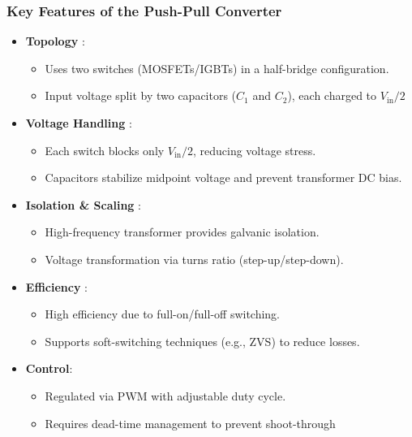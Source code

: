 \subsubsection*{Key Features of the Push-Pull Converter}
\begin{itemize}
    \item \textbf{Topology }: 
    \begin{itemize}
        \item Uses two switches (MOSFETs/IGBTs) in a half-bridge configuration.
        \item Input voltage split by two capacitors (\(C_1\) and \(C_2\)), each charged to \(V_{\text{in}}/2\)
    \end{itemize}
    \item \textbf{Voltage Handling }:
    \begin{itemize}
        \item Each switch blocks only \(V_{\text{in}}/2\), reducing voltage stress.
        \item Capacitors stabilize midpoint voltage and prevent transformer DC bias.
    \end{itemize}
    \item \textbf{Isolation \& Scaling }:
    \begin{itemize}
        \item High-frequency transformer provides galvanic isolation.
        \item Voltage transformation via turns ratio (step-up/step-down).
    \end{itemize}
    \item \textbf{Efficiency }:
    \begin{itemize}
        \item High efficiency due to full-on/full-off switching.
        \item Supports soft-switching techniques (e.g., ZVS) to reduce losses.
    \end{itemize}
    \item \textbf{Control}: 
    \begin{itemize}
        \item Regulated via PWM with adjustable duty cycle.
        \item Requires dead-time management to prevent shoot-through
    \end{itemize}
\end{itemize}
